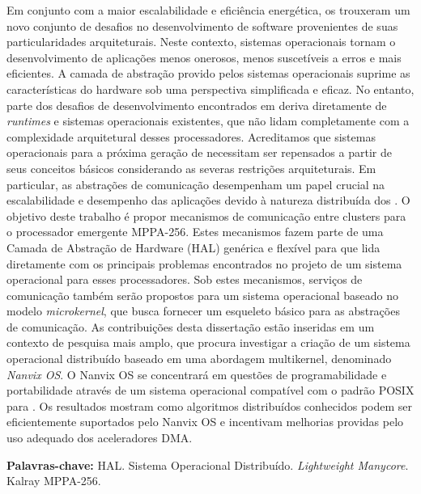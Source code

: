 
\begin{resumo}[Resumo]
	Em conjunto com a maior escalabilidade e eficiência energética, os
	\textit{\lightweight \manycores} trouxeram um novo conjunto de desafios no
	desenvolvimento de software provenientes de suas particularidades
	arquiteturais. Neste contexto, sistemas operacionais tornam o
	desenvolvimento de aplicações menos onerosos, menos suscetíveis a
	erros e mais eficientes. A camada de abstração provido pelos
	sistemas operacionais suprime as características do hardware sob
	uma perspectiva simplificada e eficaz. No entanto, parte dos desafios
	de desenvolvimento encontrados em \textit{\lightweight \manycores} deriva
	diretamente de \textit{runtimes} e sistemas operacionais existentes,
	que não lidam completamente com a complexidade arquitetural desses
	processadores. Acreditamos que sistemas operacionais para a
	próxima geração de \textit{\lightweight \manycores} necessitam ser repensados
	a partir de seus conceitos básicos considerando as severas
	restrições arquiteturais. Em particular, as abstrações de comunicação
	desempenham um papel crucial na escalabilidade e desempenho das
	aplicações devido à natureza distribuída dos \textit{\manycores}. O objetivo
	deste trabalho é propor mecanismos de comunicação entre clusters
	para o processador \textit{\manycore} emergente MPPA-256. Estes mecanismos
	fazem parte de uma Camada de Abstração de Hardware (HAL) genérica
	e flexível para \textit{\lightweight \manycores} que lida
	diretamente com os principais problemas encontrados no projeto de um
	sistema operacional para esses processadores. Sob estes mecanismos,
	serviços de comunicação também serão propostos para um sistema
	operacional baseado no modelo \textit{microkernel}, que busca fornecer
	um esqueleto básico para as abstrações de comunicação. As contribuições
	desta dissertação estão inseridas em um contexto de pesquisa mais
	amplo, que procura investigar a criação de um sistema operacional
	distribuído baseado em uma abordagem multikernel, denominado
	\textit{Nanvix OS}. O Nanvix OS se concentrará em questões de
	programabilidade e portabilidade através de um sistema operacional
	compatível com o padrão POSIX para \textit{\lightweight \manycore}. Os
	resultados mostram como algoritmos distribuídos conhecidos podem
	ser eficientemente suportados pelo Nanvix OS e incentivam melhorias
	providas pelo uso adequado dos aceleradores DMA.

	\vspace{\baselineskip}
	\textbf{Palavras-chave:} HAL. Sistema Operacional Distribuído. \textit{Lightweight Manycore}. Kalray MPPA-256.
\end{resumo}


